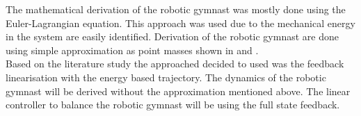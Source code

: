 \begin{comment}
\citet{Bsplines} also implements the partial feedback linearisation to create a linear response from the either the actuated or unactuated pendulum. The desired trajectory are described by using cubic B-spline shown in equation (\ref{eq:b_splines}).

\begin{equation}
\label{eq:b_splines}
q(t,P)  = \sum_{j=0}^{m}p_{j}B_{j,k}(t)
\end{equation}

The P vector describes the control points, and $B_{j,k}$ is the B-Spline basis function. Cubic B-splines are used to due to being continuous up to acceleration and improves the task for the joint motors and the input to the system.\\

\end{comment}


The mathematical derivation of the robotic gymnast was mostly done using the Euler-Lagrangian equation. This approach was used due to the  mechanical energy in the system are easily identified. Derivation of the robotic gymnast are done using simple approximation as point masses shown in \citep{derivation_controlPlaner} and \citep{tedrake}. \\

Based on the literature study the approached decided to used was the feedback linearisation with the energy based trajectory. The dynamics of the robotic gymnast will be derived without the approximation mentioned above. The linear controller to balance the robotic gymnast will be using the full state feedback.


